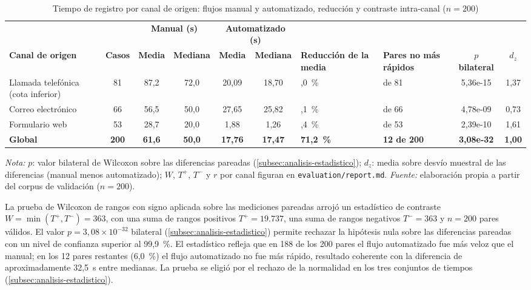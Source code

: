 \begin{table}[htbp]
\centering
\caption{Tiempo de registro por canal de origen: flujos manual y automatizado, reducción y contraste intra-canal (\(n = 200\))}
\label{tab:tiempos-canal}
\footnotesize
\setlength{\tabcolsep}{2.5pt}
\begin{tabular}{@{}>{\raggedright\arraybackslash}p{2.9cm} c c c c c >{\centering\arraybackslash}p{1.65cm} >{\centering\arraybackslash}p{1.65cm} c c@{}}
\toprule
 & & \multicolumn{2}{c}{\textbf{Manual (s)}} & \multicolumn{2}{c}{\textbf{Automatizado (s)}} & & & & \\
\cmidrule(lr){3-4}\cmidrule(lr){5-6}
\textbf{Canal de origen} & \textbf{Casos} & \textbf{Media} & \textbf{Mediana} & \textbf{Media} & \textbf{Mediana} & \textbf{Reducción de la media} & \textbf{Pares no más rápidos} & \textbf{\(p\) bilateral} & \textbf{\(d_z\)} \\
\midrule
Llamada telefónica (cota inferior) & 81 & 87,2 & 72,0 & 20,09 & 18,70 & 77,0~\% & 0 de 81 & 5,36e-15 & 1,37 \\
Correo electrónico & 66 & 56,5 & 50,0 & 27,65 & 25,82 & 51,1~\% & 12 de 66 & 4,78e-09 & 0,73 \\
Formulario web & 53 & 28,7 & 20,0 & 1,88 & 1,26 & 93,4~\% & 0 de 53 & 2,39e-10 & 1,61 \\
\midrule
\textbf{Global} & \textbf{200} & \textbf{61,6} & \textbf{50,0} & \textbf{17,76} & \textbf{17,47} & \textbf{71,2~\%} & \textbf{12 de 200} & \textbf{3,08e-32} & \textbf{1,00} \\
\bottomrule
\end{tabular}
\par\smallskip
{\footnotesize\textit{Nota:} \(p\): valor bilateral de Wilcoxon sobre las diferencias pareadas (\autoref{subsec:analisis-estadistico}); \(d_z\): media sobre desvío muestral de las diferencias (manual menos automatizado); \(W\), \(T^{+}\), \(T^{-}\) y \(r\) por canal figuran en \texttt{evaluation/report.md}. \textit{Fuente:} elaboración propia a partir del corpus de validación (\(n = 200\)).\par}
\end{table}

La prueba de Wilcoxon de rangos con signo aplicada sobre las mediciones pareadas \parencite{Wilcoxon1945_individual_comparisons,Virtanen2020_scipy} arrojó un estadístico de contraste \(W = \min(T^{+}, T^{-}) = 363\), con una suma de rangos positivos \(T^{+} = 19.737\), una suma de rangos negativos \(T^{-} = 363\) y \(n = 200\) pares válidos. El valor \(p = 3{,}08 \times 10^{-32}\) bilateral (\autoref{subsec:analisis-estadistico}) permite rechazar la hipótesis nula sobre las diferencias pareadas con un nivel de confianza superior al 99,9~\%. El estadístico refleja que en 188 de los 200 pares el flujo automatizado fue más veloz que el manual; en los 12 pares restantes (6,0~\%) el flujo automatizado no fue más rápido, resultado coherente con la diferencia de aproximadamente 32,5~s entre medianas. La prueba se eligió por el rechazo de la normalidad en los tres conjuntos de tiempos (\autoref{subsec:analisis-estadistico}).

